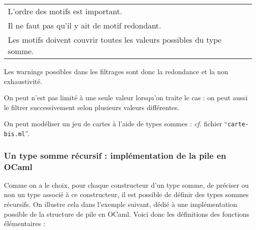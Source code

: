 			\renewcommand{\arraystretch}{1}
			\begin{Remarque}
				\!\!\begin{tabular}[t]{l}
				\bdot L'ordre des motifs est important. \\
				\bdot Il ne faut pas qu'il y ait de motif redondant. \\
				\bdot Les motifs doivent couvrir toutes les valeurs possibles du type somme.			
				\end{tabular} \nt
			Les warnings possibles dans les filtrages sont donc la redondance et la non exhaustivité.
			\end{Remarque}
			\vs{2}
			\begin{Remarque}
				On peut n'est pas limité à une seule valeur lorsqu'on traite le cas  : on peut aussi le filtrer successivement selon plusieurs valeurs  différentes.
			\end{Remarque}
			
			\begin{Exemple}
				On peut modéliser un jeu de cartes à l'aide de types sommes : \emph{cf.} fichier ``\texttt{carte-bis.ml}''.
			\end{Exemple}
			
		\subsubsection{Un type somme récursif : implémentation de la pile en OCaml}
		
			Comme on a le choix, pour chaque constructeur d'un type somme, de préciser ou non un type associé à ce constructeur, il est possible de définir des types sommes récursifs. On illustre cela dans l'exemple suivant, dédié à une implémentation possible de la structure de pile en OCaml. \nll
			Voici donc les définitions des fonctions élémentaires :
			
